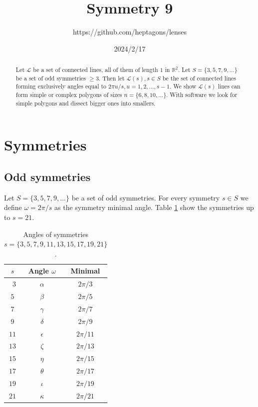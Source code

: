 \documentclass[11pt]{article}
\title{Symmetry 9}
\author{https://github.com/heptagons/lenses}
\date{2024/2/17}
\begin{document}
\maketitle
\begin{abstract}
Let $\mathcal{L}$ be a set of connected lines, all of them of length $1$ in $\mathbb{R}^2$.
Let $S=\{ 3,5,7,9,... \}$ be a set of odd symmetries $\geq 3$. Then let $\mathcal{L}(s), s \in S$ be the set of connected lines forming exclusively angles equal to $2\pi u/s, u = 1,2,...,s-1$. We show $\mathcal{L}(s)$ lines can form simple or complex polygons of sizes $n=\{ 6,8,10,... \}$. With software we look for simple polygons and dissect bigger ones into smallers.
\end{abstract}

\section{Symmetries}

\subsection{Odd symmetries}

Let $S=\{ 3,5,7,9,... \}$ be a set of odd symmetries. For every symmetry $s \in S$ we define $\omega = 2\pi/s$ as the symmetry minimal angle. Table \ref{tbl:symm} show the symmetries up to $s=21$. 

\begin{table}[H]
\begin{center}
\begin{tabular}{|c|c c|}
\hline
$s$ & Angle $\omega$ & Minimal \\ \hline\
$3$ & $\alpha$ & $2\pi/3$ \\ \hline
$5$ & $\beta$  & $2\pi/5$ \\ \hline
$7$ & $\gamma$ & $2\pi/7$ \\ \hline
$9$ & $\delta$ & $2\pi/9$ \\ \hline
$11$ & $\epsilon$ & $2\pi/11$ \\ \hline
$13$ & $\zeta$ & $2\pi/13$ \\ \hline
$15$ & $\eta$ & $2\pi/15$ \\ \hline
$17$ & $\theta$ & $2\pi/17$ \\ \hline
$19$ & $\iota$ & $2\pi/19$ \\ \hline
$21$ & $\kappa$ & $2\pi/21$ \\ \hline
\end{tabular}
\caption{Angles of symmetries $s=\{3,5,7,9,11,13,15,17,19,21\}$.} 
\label{tbl:symm}
\end{center}
\end{table}
\end{document}
